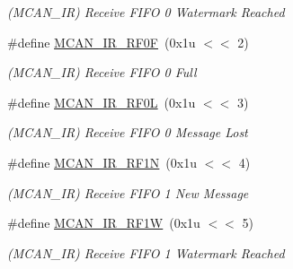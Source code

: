 \begin{DoxyCompactItemize}
\begin{DoxyCompactList}\small\item\em (M\+C\+A\+N\+\_\+\+IR) Receive F\+I\+FO 0 Watermark Reached \end{DoxyCompactList}\item 
\mbox{\label{group__SAMV71__MCAN_ga44f1311d0493df220a46beb576f30b8f}} 
\#define \mbox{\hyperlink{group__SAMV71__MCAN_ga44f1311d0493df220a46beb576f30b8f}{M\+C\+A\+N\+\_\+\+I\+R\+\_\+\+R\+F0F}}~(0x1u $<$$<$ 2)
\begin{DoxyCompactList}\small\item\em (M\+C\+A\+N\+\_\+\+IR) Receive F\+I\+FO 0 Full \end{DoxyCompactList}\item 
\mbox{\label{group__SAMV71__MCAN_gae764db6f724695066df806871647f144}} 
\#define \mbox{\hyperlink{group__SAMV71__MCAN_gae764db6f724695066df806871647f144}{M\+C\+A\+N\+\_\+\+I\+R\+\_\+\+R\+F0L}}~(0x1u $<$$<$ 3)
\begin{DoxyCompactList}\small\item\em (M\+C\+A\+N\+\_\+\+IR) Receive F\+I\+FO 0 Message Lost \end{DoxyCompactList}\item 
\mbox{\label{group__SAMV71__MCAN_ga9922ff338c779136761e64d0a5a09473}} 
\#define \mbox{\hyperlink{group__SAMV71__MCAN_ga9922ff338c779136761e64d0a5a09473}{M\+C\+A\+N\+\_\+\+I\+R\+\_\+\+R\+F1N}}~(0x1u $<$$<$ 4)
\begin{DoxyCompactList}\small\item\em (M\+C\+A\+N\+\_\+\+IR) Receive F\+I\+FO 1 New Message \end{DoxyCompactList}\item 
\mbox{\label{group__SAMV71__MCAN_gacefc65a4f21c0654033ad381c3e1a7e8}} 
\#define \mbox{\hyperlink{group__SAMV71__MCAN_gacefc65a4f21c0654033ad381c3e1a7e8}{M\+C\+A\+N\+\_\+\+I\+R\+\_\+\+R\+F1W}}~(0x1u $<$$<$ 5)
\begin{DoxyCompactList}\small\item\em (M\+C\+A\+N\+\_\+\+IR) Receive F\+I\+FO 1 Watermark Reached \end{DoxyCompactList}\item 
\mbox{\label{group__SAMV71__MCAN_gadc72250dd1be6299a69c6df46e1bd293}} 

\end{DoxyCompactItemize}
